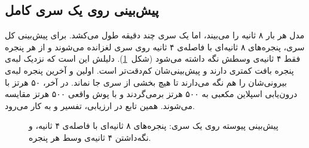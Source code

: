 \subsection{پیش‌بینی روی یک سری کامل}

مدل هر بار ۸ ثانیه را می‌بیند، اما یک سری چند دقیقه طول می‌کشد. برای پیش‌بینی کل سری، پنجره‌های ۸ ثانیه‌ای با فاصله‌ی ۴ ثانیه روی سری لغزانده می‌شوند و از هر پنجره فقط ۴ ثانیه‌ی وسطش نگه داشته می‌شود (شکل~\ref{fig:stitch}). دلیلش این است که  نزدیک لبه‌ی پنجره بافت کمتری دارند و پیش‌بینی‌شان کم‌دقت‌تر است. اولین و آخرین پنجره لبه‌ی بیرونی‌شان را هم نگه می‌دارند تا هیچ بخشی از سری جا نماند. در آخر،  ۵۰ هرتز با درون‌یابی اسپلاین مکعبی به ۵۰۰ هرتز برمی‌گردند و با پوش واقعی ۵۰۰ هرتز مقایسه می‌شوند. همین تابع در ارزیابی، تفسیر و  به کار می‌رود.

\begin{figure}[htbp]
\centering

\caption{پیش‌بینی پیوسته روی یک سری: پنجره‌های ۸ ثانیه‌ای با فاصله‌ی ۴ ثانیه، و نگه‌داشتن ۴ ثانیه‌ی وسط هر پنجره.}
\label{fig:stitch}
\end{figure}

